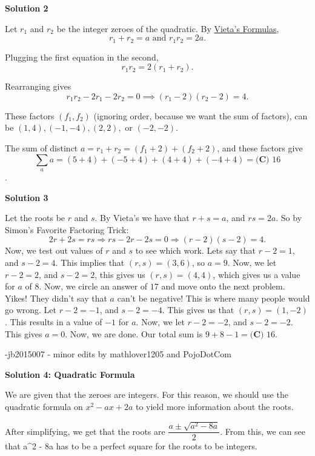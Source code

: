 \begin{enumerate}
 



\textbf{Solution 2}

Let $r_1$ and $r_2$ be the integer zeroes of the quadratic. By \href{https://artofproblemsolving.com/wiki/index.php?title=Vieta\%27s\_Formulas}{Vieta's Formulas}, 
 \[r_1 + r_2 = a\text{ and }r_1r_2 = 2a.\]

 Plugging the first equation in the second, 
 \[r_1r_2 = 2 (r_1 + r_2).\] 

 Rearranging gives 
 \[r_1r_2 - 2r_1 - 2r_2 = 0 \implies (r_1 - 2)(r_2 - 2) = 4.\]

 These factors $(f_1,f_2)$ (ignoring order, because we want the sum of factors), can be $(1, 4), (-1, -4), (2, 2),$ or $(-2, -2)$.

 The sum of distinct $a = r_1 + r_2 = (f_1+2) + (f_2+2)$, and these factors give 
 \[\sum_a a = (5+4) + (-5+4) + (4+4) + (-4+4) = \boxed{\textbf{(C) }16}\].

 


 



\textbf{Solution 3}

Let the roots be $r$ and $s$. By Vieta's we have that $r+s = a$, and $rs = 2a$. So by Simon's Favorite Factoring Trick: 
 \[2r+2s = rs \Longrightarrow rs-2r-2s = 0 \Longrightarrow (r-2)(s-2) = 4.\] Now, we test out values of $r$ and $s$ to see which work. Lets say that $r-2 = 1$, and $s-2 = 4$. This implies that $(r,s) = (3,6)$, so $a = 9$. Now, we let $r-2 = 2$, and $s-2 = 2$, this gives us $(r,s) = (4,4)$, which gives us a value for $a$ of $8$. Now, we circle an answer of $17$ and move onto the next problem. Yikes! They didn't say that $a$ can't be negative! This is where many people would go wrong. Let $r-2 = -1$, and $s-2 = -4$. This gives us that $(r,s) = (1,-2)$. This results in a value of $-1$ for $a$. Now, we let $r-2 = -2$, and $s-2 = -2$. This gives $a = 0$. Now, we are done. Our total sum is $9+8-1 = \boxed{\textbf{(C) }16}$.

 -jb2015007 - minor edits by mathlover1205 and PojoDotCom

 



\textbf{Solution 4: Quadratic Formula}

We are given that the zeroes are integers. For this reason, we should use the quadratic formula on $x^2 - ax + 2a$ to yield more information about the roots. 

 After simplifying, we get that the roots are $\dfrac{a \pm \sqrt{a^2 - 8a}}{2}$. From this, we can see that a\textasciicircum{}2 - 8a has to be a perfect square for the roots to be integers. 


\end{enumerate}
